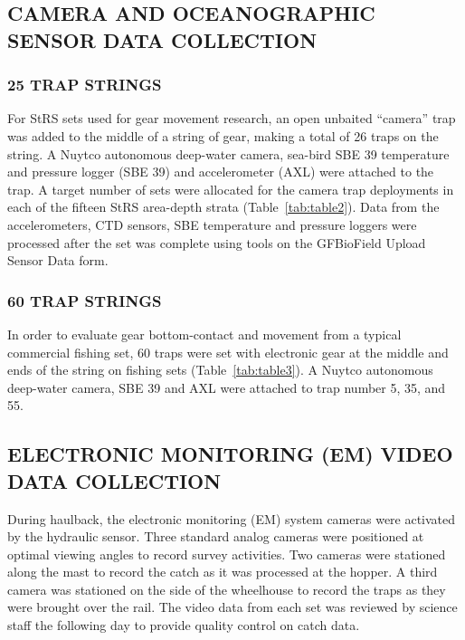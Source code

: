 \documentclass[12pt]{article}\usepackage[]{graphicx}\usepackage[]{color}
\begin{document}
\hypertarget{camera-and-oceanographic-sensor-data-collection}{%
\subsection{CAMERA AND OCEANOGRAPHIC SENSOR DATA COLLECTION}\label{camera-and-oceanographic-sensor-data-collection}}

\hypertarget{trap-strings-2}{%
\subsubsection{25 TRAP STRINGS}\label{trap-strings-2}}

For StRS sets used for gear movement research, an open unbaited ``camera'' trap was added to the middle of a string of gear, making a total of 26 traps on the string. A Nuytco autonomous deep-water camera, sea-bird SBE 39 temperature and pressure logger (SBE 39) and accelerometer (AXL) were attached to the trap. A target number of sets were allocated for the camera trap deployments in each of the fifteen StRS area-depth strata (Table~\ref{tab:table2}). Data from the accelerometers, CTD sensors, SBE temperature and pressure loggers were processed after the set was complete using tools on the GFBioField Upload Sensor Data form.

\hypertarget{trap-strings-3}{%
\subsubsection{60 TRAP STRINGS}\label{trap-strings-3}}

In order to evaluate gear bottom-contact and movement from a typical commercial fishing set, 60 traps were set with electronic gear at the middle and ends of the string on fishing sets (Table~\ref{tab:table3}). A Nuytco autonomous deep-water camera, SBE 39 and AXL were attached to trap number 5, 35, and 55.

\hypertarget{electronic-monitoring-em-video-data-collection}{%
\subsection{ELECTRONIC MONITORING (EM) VIDEO DATA COLLECTION}\label{electronic-monitoring-em-video-data-collection}}

During haulback, the electronic monitoring (EM) system cameras were activated by the hydraulic sensor. Three standard analog cameras were positioned at optimal viewing angles to record survey activities. Two cameras were stationed along the mast to record the catch as it was processed at the hopper. A third camera was stationed on the side of the wheelhouse to record the traps as they were brought over the rail. The video data from each set was reviewed by science staff the following day to provide quality control on catch data.
\end{document}
